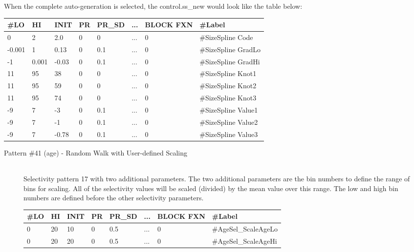\begin{description}
	When the complete auto-generation is selected, the control.ss\_new would look like the table below:
	
	\begin{center}
		\begin{longtable}{p{0.8cm} p{0.8cm} p{1cm} p{0.8cm} p{1.75cm}p{1cm} p{1.2cm} p{5.2cm}}
			\hline
			\#LO & HI & INIT & PR & PR\_SD & ... & BLOCK FXN & \#Label \\
			\hline
			0      &     2 &   2.0 & 0 & 0   & ... & 0 & \#SizeSpline Code\\
			-0.001 & 	 1 &  0.13 & 0 & 0.1 & ... & 0 & \#SizeSpline GradLo\\
			-1     & 0.001 & -0.03 & 0 & 0.1 & ... & 0 & \#SizeSpline GradHi\\
			11     & 	95 & 	38 & 0 & 0   & ... & 0 & \#SizeSpline Knot1\\
			11     & 	95 & 	59 & 0 & 0   & ... & 0 & \#SizeSpline Knot2\\
			11     & 	95 & 	74 & 0 & 0   & ... & 0 & \#SizeSpline Knot3\\
			-9     & 	 7 & 	-3 & 0 & 0.1 & ... & 0 & \#SizeSpline Value1\\
			-9     &   	 7 & 	-1 & 0 & 0.1 & ... & 0 & \#SizeSpline Value2\\
			-9     & 	 7 & -0.78 & 0 & 0.1 & ... & 0 & \#SizeSpline Value3\\
			\hline
		\end{longtable}
	\end{center}
\end{description}


\begin{description}
	\item[Pattern \#41 (age) - Random Walk with User-defined Scaling]\hfil\\
	Selectivity pattern 17 with two additional parameters. The two additional parameters are the bin numbers to define the range of bins for scaling. All of the selectivity values will be scaled (divided) by the mean value over this range. The low and high bin numbers are defined before the other selectivity parameters.

	\begin{center}
		\begin{longtable}{p{0.8cm} p{0.8cm} p{1cm} p{0.8cm} p{1.75cm}p{1cm} p{1.2cm} p{5.2cm}}
			\hline
			\#LO & HI & INIT & PR & PR\_SD & ... & BLOCK FXN & \#Label \\
			\hline
			0 & 20 & 10 & 0 & 0.5 & ... & 0 & \#AgeSel\_ScaleAgeLo \\
			0 & 20 & 20 & 0 & 0.5 & ... & 0 & \#AgeSel\_ScaleAgeHi \\
			\hline
		\end{longtable}
	\end{center}
\end{description}


